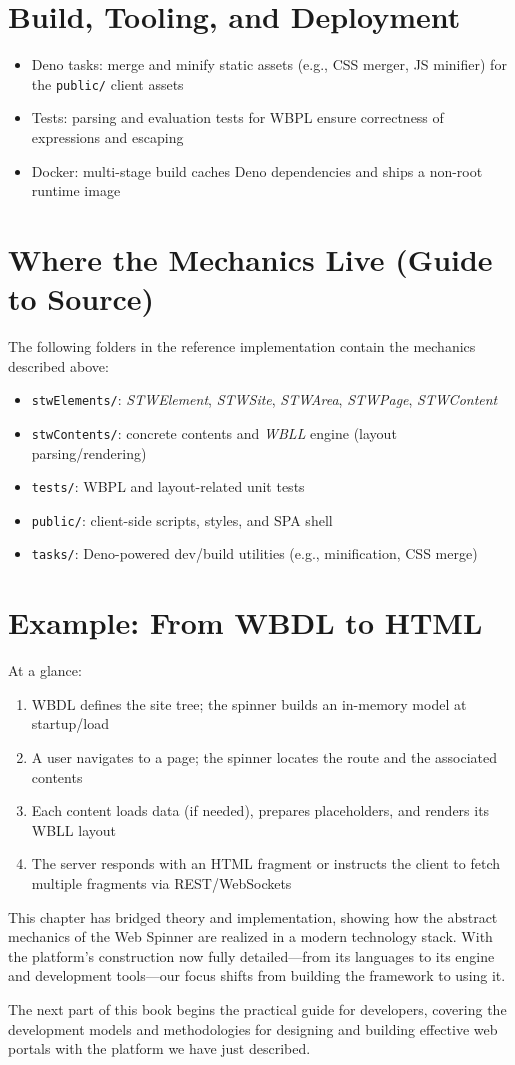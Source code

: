 \section{Build, Tooling, and Deployment}
\begin{itemize}
	\item Deno tasks: merge and minify static assets (e.g., CSS merger, JS minifier) for the \texttt{public/} client assets
	\item Tests: parsing and evaluation tests for WBPL ensure correctness of expressions and escaping
	\item Docker: multi-stage build caches Deno dependencies and ships a non-root runtime image
\end{itemize}

\section{Where the Mechanics Live (Guide to Source)}
The following folders in the reference implementation contain the mechanics described above:
\begin{itemize}
	\item \texttt{stwElements/}: \textit{STWElement}, \textit{STWSite}, \textit{STWArea}, \textit{STWPage}, \textit{STWContent}
	\item \texttt{stwContents/}: concrete contents and \textit{WBLL} engine (layout parsing/rendering)
	\item \texttt{tests/}: WBPL and layout-related unit tests
	\item \texttt{public/}: client-side scripts, styles, and SPA shell
	\item \texttt{tasks/}: Deno-powered dev/build utilities (e.g., minification, CSS merge)
\end{itemize}

\section{Example: From WBDL to HTML}
At a glance:
\begin{enumerate}
	\item WBDL defines the site tree; the spinner builds an in-memory model at startup/load
	\item A user navigates to a page; the spinner locates the route and the associated contents
	\item Each content loads data (if needed), prepares placeholders, and renders its WBLL layout
	\item The server responds with an HTML fragment or instructs the client to fetch multiple fragments via REST/WebSockets
\end{enumerate}

\noindent This chapter has bridged theory and implementation, showing how the abstract mechanics of the Web Spinner are realized in a modern technology stack. With the platform's construction now fully detailed—from its languages to its engine and development tools—our focus shifts from building the framework to using it.

The next part of this book begins the practical guide for developers, covering the development models and methodologies for designing and building effective web portals with the platform we have just described.
